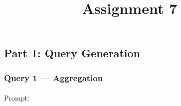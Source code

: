 \documentclass[
  letterpaper,
  DIV=11,
  numbers=noendperiod]{scrartcl}
\title{Assignment 7}
\author{}
\date{}
\makeatletter
\let\oldparagraph\paragraph
\renewcommand{\paragraph}{
    \@ifstar
      \xxxParagraphStar
      \xxxParagraphNoStar
  }
\newcommand{\xxxParagraphStar}[1]{\oldparagraph*{#1}\mbox{}}
\newcommand{\xxxParagraphNoStar}[1]{\oldparagraph{#1}\mbox{}}
\makeatother
\begin{document}
\maketitle


\subsection{Part 1: Query Generation}\label{part-1-query-generation}

\subsubsection{Query 1 --- Aggregation}\label{query-1-aggregation}

\paragraph{Prompt:}\label{prompt}
\end{document}
